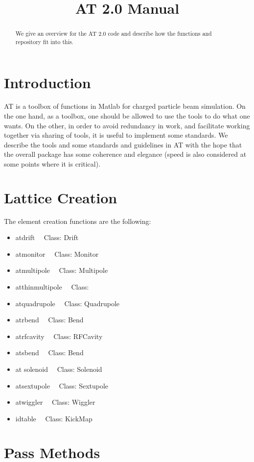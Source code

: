 \documentclass[acus]{article}
\begin{document}
\title{AT 2.0 Manual}
\maketitle
\begin{abstract}
We give an overview for the AT 2.0 code and describe how the functions and repository fit into this.
\end{abstract}


\section{Introduction}
AT is a toolbox of functions in Matlab for charged particle beam simulation.
On the one hand, as a toolbox, one should be allowed to use the tools to do what one wants.
On the other, in order to avoid redundancy in work, and facilitate working together via sharing of tools, it is useful to implement some standards.  We describe the tools and some standards and guidelines in AT with the hope that the overall package has some coherence and elegance (speed is also considered at some points where it is critical).

\section{Lattice Creation}
The element creation functions are the following:
\begin{itemize}
\item atdrift \ \ Class: Drift
\item atmonitor \ \ Class: Monitor
\item atmultipole \ \ Class: Multipole
\item atthinmultipole \ \ Class: 
\item atquadrupole  \ \ Class: Quadrupole
\item atrbend  \ \ Class: Bend 
\item atrfcavity \ \ Class: RFCavity
\item atsbend \ \ Class: Bend
\item at solenoid \ \ Class: Solenoid
\item atsextupole  \ \ Class: Sextupole
\item atwiggler  \ \ Class: Wiggler
\item idtable  \ \ Class:  KickMap
\end{itemize}


\section{Pass Methods}
\end{document}
